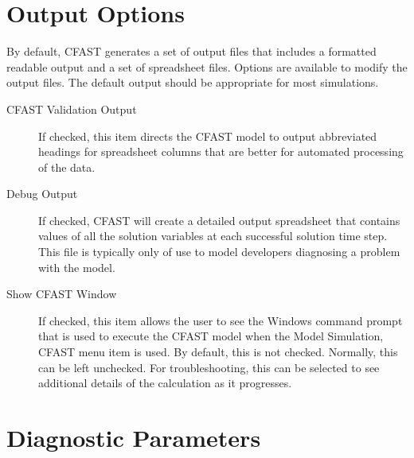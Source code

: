 {{\section{Output Options}

By default, CFAST generates a set of output files that includes a formatted readable output and a set of spreadsheet files.  Options are available to modify the output files.  The default output should be appropriate for most simulations.

\begin{description}
    \item[CFAST Validation Output] If checked, this item directs the CFAST model to output abbreviated headings for spreadsheet columns that are better for automated processing of the data.
    \item[Debug Output] If checked, CFAST will create a detailed output spreadsheet that contains values of all the solution variables at each successful solution time step. This file is typically only of use to model developers diagnosing a problem with the model.
    \item[Show CFAST Window] If checked, this item allows the user to see the Windows command prompt that is used to execute the CFAST model when the Model Simulation, CFAST menu item is used.  By default, this is not checked.  Normally, this can be left unchecked.  For troubleshooting, this can be selected to see additional details of the calculation as it progresses.
\end{description}

\section{Diagnostic Parameters}
\label{info:DIAG}

}}
